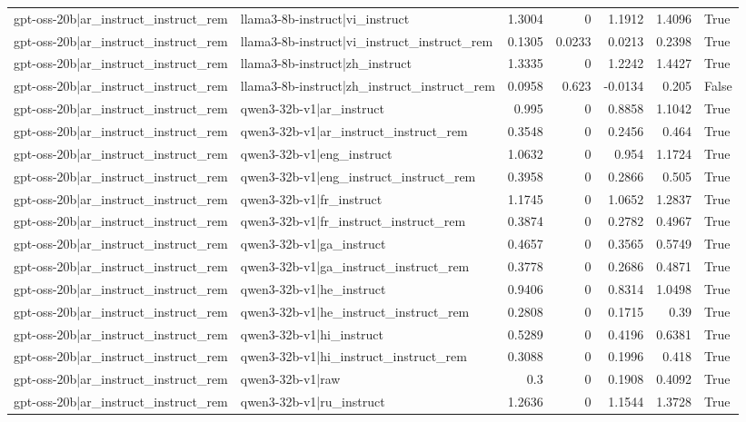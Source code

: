 \begin{table}
\begin{tabular}{l l r r r r l}
gpt-oss-20b|ar_instruct_instruct_rem & llama3-8b-instruct|vi_instruct & 1.3004 & 0 & 1.1912 & 1.4096 & True \\
gpt-oss-20b|ar_instruct_instruct_rem & llama3-8b-instruct|vi_instruct_instruct_rem & 0.1305 & 0.0233 & 0.0213 & 0.2398 & True \\
gpt-oss-20b|ar_instruct_instruct_rem & llama3-8b-instruct|zh_instruct & 1.3335 & 0 & 1.2242 & 1.4427 & True \\
gpt-oss-20b|ar_instruct_instruct_rem & llama3-8b-instruct|zh_instruct_instruct_rem & 0.0958 & 0.623 & -0.0134 & 0.205 & False \\
gpt-oss-20b|ar_instruct_instruct_rem & qwen3-32b-v1|ar_instruct & 0.995 & 0 & 0.8858 & 1.1042 & True \\
gpt-oss-20b|ar_instruct_instruct_rem & qwen3-32b-v1|ar_instruct_instruct_rem & 0.3548 & 0 & 0.2456 & 0.464 & True \\
gpt-oss-20b|ar_instruct_instruct_rem & qwen3-32b-v1|eng_instruct & 1.0632 & 0 & 0.954 & 1.1724 & True \\
gpt-oss-20b|ar_instruct_instruct_rem & qwen3-32b-v1|eng_instruct_instruct_rem & 0.3958 & 0 & 0.2866 & 0.505 & True \\
gpt-oss-20b|ar_instruct_instruct_rem & qwen3-32b-v1|fr_instruct & 1.1745 & 0 & 1.0652 & 1.2837 & True \\
gpt-oss-20b|ar_instruct_instruct_rem & qwen3-32b-v1|fr_instruct_instruct_rem & 0.3874 & 0 & 0.2782 & 0.4967 & True \\
gpt-oss-20b|ar_instruct_instruct_rem & qwen3-32b-v1|ga_instruct & 0.4657 & 0 & 0.3565 & 0.5749 & True \\
gpt-oss-20b|ar_instruct_instruct_rem & qwen3-32b-v1|ga_instruct_instruct_rem & 0.3778 & 0 & 0.2686 & 0.4871 & True \\
gpt-oss-20b|ar_instruct_instruct_rem & qwen3-32b-v1|he_instruct & 0.9406 & 0 & 0.8314 & 1.0498 & True \\
gpt-oss-20b|ar_instruct_instruct_rem & qwen3-32b-v1|he_instruct_instruct_rem & 0.2808 & 0 & 0.1715 & 0.39 & True \\
gpt-oss-20b|ar_instruct_instruct_rem & qwen3-32b-v1|hi_instruct & 0.5289 & 0 & 0.4196 & 0.6381 & True \\
gpt-oss-20b|ar_instruct_instruct_rem & qwen3-32b-v1|hi_instruct_instruct_rem & 0.3088 & 0 & 0.1996 & 0.418 & True \\
gpt-oss-20b|ar_instruct_instruct_rem & qwen3-32b-v1|raw & 0.3 & 0 & 0.1908 & 0.4092 & True \\
gpt-oss-20b|ar_instruct_instruct_rem & qwen3-32b-v1|ru_instruct & 1.2636 & 0 & 1.1544 & 1.3728 & True \\

\end{tabular}
\end{table}
